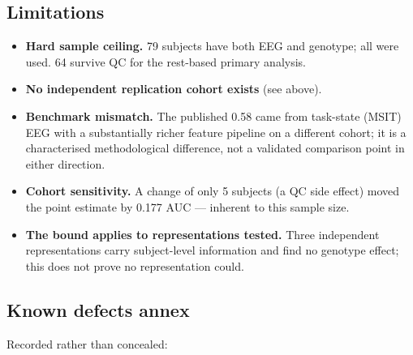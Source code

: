 \documentclass[11pt]{article}
\begin{document}
\subsection{Limitations}

\begin{itemize}[leftmargin=1.2cm]
  \item \textbf{Hard sample ceiling.} 79 subjects have both EEG and genotype; all
        were used. 64 survive QC for the rest-based primary analysis.
  \item \textbf{No independent replication cohort exists} (see above).
  \item \textbf{Benchmark mismatch.} The published 0.58 came from task-state
        (MSIT) EEG with a substantially richer feature pipeline on a different
        cohort; it is a characterised methodological difference, not a validated
        comparison point in either direction.
  \item \textbf{Cohort sensitivity.} A change of only 5 subjects (a QC side
        effect) moved the point estimate by 0.177 AUC --- inherent to this sample
        size.
  \item \textbf{The bound applies to representations tested.} Three independent
        representations carry subject-level information and find no genotype
        effect; this does not prove no representation could.
\end{itemize}

\subsection{Known defects annex}

Recorded rather than concealed:
\end{document}
